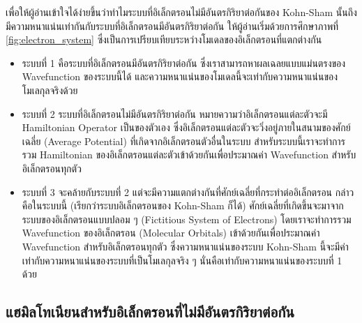 เพื่อให้ผู้อ่านเข้าใจได้ง่ายขึ้นว่าทำไมระบบที่อิเล็กตรอนไม่มีอันตรกิริยาต่อกันของ Kohn-Sham นั้นถึงมีความหนาแน่นเท่ากันกับระบบที่อิเล็กตรอนมีอันตรกิริยาต่อกัน ให้ผู้อ่านเริ่มด้วยการศึกษาภาพที่ \ref{fig:electron_system} ซึ่งเป็นการเปรียบเทียบระหว่างโมเดลของอิเล็กตรอนที่แตกต่างกัน
%
\begin{itemize}[topsep=0pt,noitemsep]\setlength\itemsep{0.5em}
    \item ระบบที่ 1 คือระบบที่อิเล็กตรอนมีอันตรกิริยาต่อกัน ซึ่งเราสามารถหาผลเฉลยแบบแม่นตรงของ Wavefunction ของระบบนี้ได้ และความหนาแน่นของโมเดลนี้จะเท่ากับความหนาแน่นของโมเลกุลจริงด้วย

    \item ระบบที่ 2 ระบบที่อิเล็กตรอนไม่มีอันตรกิริยาต่อกัน หมายความว่าอิเล็กตรอนแต่ละตัวจะมี Hamiltonian Operator เป็นของตัวเอง ซึ่งอิเล็กตรอนแต่ละตัวจะวิ่งอยู่ภายในสนามของศักย์เฉลี่ย (Average Potential) ที่เกิดจากอิเล็กตรอนตัวอื่นในระบบ สำหรับระบบนี้เราจะทำการรวม Hamiltonian ของอิเล็กตรอนแต่ละตัวเข้าด้วยกันเพื่อประมาณค่า Wavefunction สำหรับอิเล็กตรอนทุกตัว

    \item ระบบที่ 3 จะคล้ายกับระบบที่ 2 แต่จะมีความแตกต่างกันที่ศักย์เฉลี่ยที่กระทำต่ออิเล็กตรอน กล่าวคือในระบบนี้ (เรียกว่าระบบอิเล็กตรอนของ Kohn-Sham ก็ได้) ศักย์เฉลี่ยที่เกิดขึ้นจะมาจากระบบของอิเล็กตรอนแบบปลอม ๆ (Fictitious System of Electrons) โดยเราจะทำการรวม Wavefunction ของอิเล็กตรอน (Molecular Orbitals) เข้าด้วยกันเพื่อประมาณค่า Wavefunction สำหรับอิเล็กตรอนทุกตัว ซึ่งความหนาแน่นของระบบ Kohn-Sham นี้จะมีค่าเท่ากับความหนาแน่นของระบบที่เป็นโมเลกุลจริง ๆ นั่นคือเท่ากับความหนาแน่นของระบบที่ 1 ด้วย
\end{itemize}

\subsection{แฮมิลโทเนียนสำหรับอิเล็กตรอนที่ไม่มีอันตรกิริยาต่อกัน}
\label{ssec:hamil_noninter_elec}

